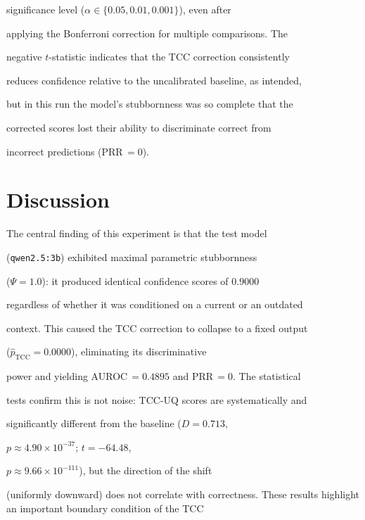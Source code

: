 \documentclass[10pt,twoside]{article}
\numberwithin{equation}{section}
\begin{document}
significance level ($\alpha \in \{0.05, 0.01, 0.001\}$), even after

applying the Bonferroni correction for multiple comparisons. The

negative $t$-statistic indicates that the TCC correction consistently

reduces confidence relative to the uncalibrated baseline, as intended,

but in this run the model's stubbornness was so complete that the

corrected scores lost their ability to discriminate correct from

incorrect predictions (PRR\,$= 0$).



\vspace{-20pt} 


\section*{Discussion}




The central finding of this experiment is that the test model

(\texttt{qwen2.5:3b}) exhibited maximal parametric stubbornness

($\Psi = 1.0$): it produced identical confidence scores of $0.9000$

regardless of whether it was conditioned on a current or an outdated

context. This caused the TCC correction to collapse to a fixed output

($\hat{p}_{\mathrm{TCC}} = 0.0000$), eliminating its discriminative

power and yielding AUROC\,$= 0.4895$ and PRR\,$= 0$. The statistical

tests confirm this is not noise: TCC-UQ scores are systematically and

significantly different from the baseline ($D = 0.713$,

$p \approx 4.90\times10^{-37}$; $t = -64.48$,

$p \approx 9.66\times10^{-111}$), but the direction of the shift

(uniformly downward) does not correlate with correctness. These results highlight an important boundary condition of the TCC
\end{document}
